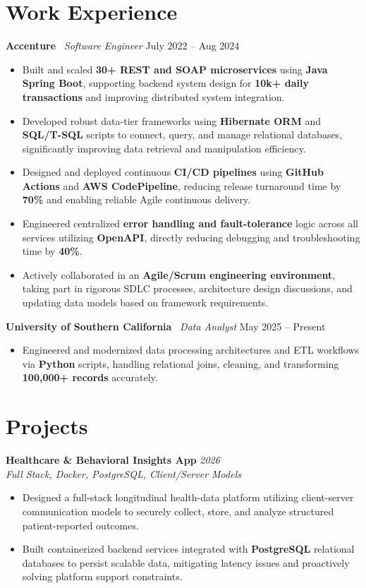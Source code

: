 \documentclass[letterpaper,11pt]{article}
\begin{document}
\section*{Work Experience}

\textbf{Accenture} \textbar\ \textit{Software Engineer} \hfill July 2022 -- Aug 2024
\begin{itemize} \itemsep -2pt
    \item Built and scaled \textbf{30+ REST and SOAP microservices} using \textbf{Java Spring Boot}, supporting backend system design for \textbf{10k+ daily transactions} and improving distributed system integration.
    \item Developed robust data-tier frameworks using \textbf{Hibernate ORM} and \textbf{SQL/T-SQL} scripts to connect, query, and manage relational databases, significantly improving data retrieval and manipulation efficiency.
    \item Designed and deployed continuous \textbf{CI/CD pipelines} using \textbf{GitHub Actions} and \textbf{AWS CodePipeline}, reducing release turnaround time by \textbf{70\%} and enabling reliable Agile continuous delivery.
    \item Engineered centralized \textbf{error handling and fault-tolerance} logic across all services utilizing \textbf{OpenAPI}, directly reducing debugging and troubleshooting time by \textbf{40\%}.
    \item Actively collaborated in an \textbf{Agile/Scrum engineering environment}, taking part in rigorous SDLC processes, architecture design discussions, and updating data models based on framework requirements.
\end{itemize}

\textbf{University of Southern California} \textbar\ \textit{Data Analyst} \hfill May 2025 -- Present
\begin{itemize} \itemsep -2pt
    \item Engineered and modernized data processing architectures and ETL workflows via \textbf{Python} scripts, handling relational joins, cleaning, and transforming \textbf{100,000+ records} accurately.
\end{itemize}

\section*{Projects}

\textbf{Healthcare \& Behavioral Insights App} \hfill \textit{2026} \\
\textit{Full Stack, Docker, PostgreSQL, Client/Server Models}
\begin{itemize} \itemsep -2pt
    \item Designed a full-stack longitudinal health-data platform utilizing client-server communication models to securely collect, store, and analyze structured patient-reported outcomes.
    \item Built containerized backend services integrated with \textbf{PostgreSQL} relational databases to persist scalable data, mitigating latency issues and proactively solving platform support constraints.
\end{itemize}
\end{document}
